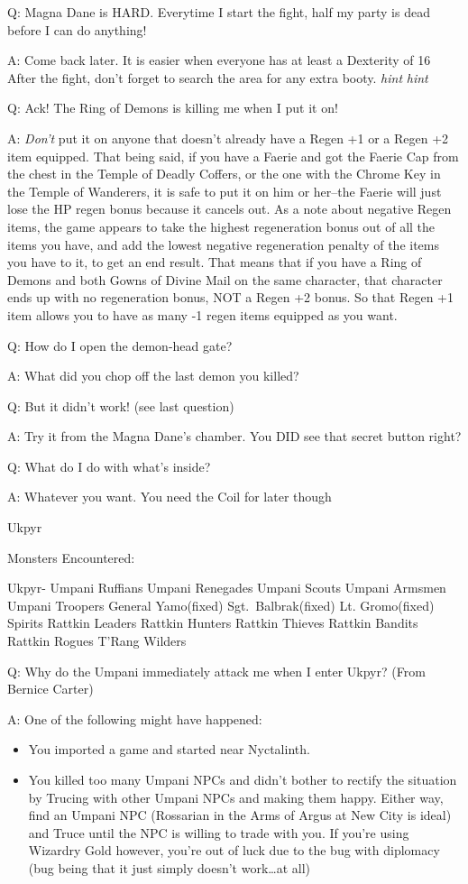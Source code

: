 \documentclass[12pt]{article}
\providecommand{\tightlist}{%
  \setlength{\itemsep}{0pt}\setlength{\parskip}{0pt}}
\begin{document}
Q: Magna Dane is HARD. Everytime I start the fight, half my party is
dead before I can do anything!

A: Come back later. It is easier when everyone has at least a Dexterity
of 16 After the fight, don't forget to search the area for any extra
booty. \emph{hint} \emph{hint}

Q: Ack! The Ring of Demons is killing me when I put it on!

A: \emph{Don't} put it on anyone that doesn't already have a Regen +1 or
a Regen +2 item equipped. That being said, if you have a Faerie and got
the Faerie Cap from the chest in the Temple of Deadly Coffers, or the
one with the Chrome Key in the Temple of Wanderers, it is safe to put it
on him or her--the Faerie will just lose the HP regen bonus because it
cancels out. As a note about negative Regen items, the game appears to
take the highest regeneration bonus out of all the items you have, and
add the lowest negative regeneration penalty of the items you have to
it, to get an end result. That means that if you have a Ring of Demons
and both Gowns of Divine Mail on the same character, that character ends
up with no regeneration bonus, NOT a Regen +2 bonus. So that Regen +1
item allows you to have as many -1 regen items equipped as you want.

Q: How do I open the demon-head gate?

A: What did you chop off the last demon you killed?

Q: But it didn't work! (see last question)

A: Try it from the Magna Dane's chamber. You DID see that secret button
right?

Q: What do I do with what's inside?

A: Whatever you want. You need the Coil for later though

Ukpyr

Monsters Encountered:

Ukpyr- Umpani Ruffians Umpani Renegades Umpani Scouts Umpani Armsmen
Umpani Troopers General Yamo(fixed) Sgt.~Balbrak(fixed) Lt. Gromo(fixed)
Spirits Rattkin Leaders Rattkin Hunters Rattkin Thieves Rattkin Bandits
Rattkin Rogues T'Rang Wilders

Q: Why do the Umpani immediately attack me when I enter Ukpyr? (From
Bernice Carter)

A: One of the following might have happened:

\begin{itemize}
\tightlist
\item
  You imported a game and started near Nyctalinth.
\item
  You killed too many Umpani NPCs and didn't bother to rectify the
  situation by Trucing with other Umpani NPCs and making them happy.
  Either way, find an Umpani NPC (Rossarian in the Arms of Argus at New
  City is ideal) and Truce until the NPC is willing to trade with you.
  If you're using Wizardry Gold however, you're out of luck due to the
  bug with diplomacy (bug being that it just simply doesn't
  work\ldots{}at all)
\end{itemize}
\end{document}
